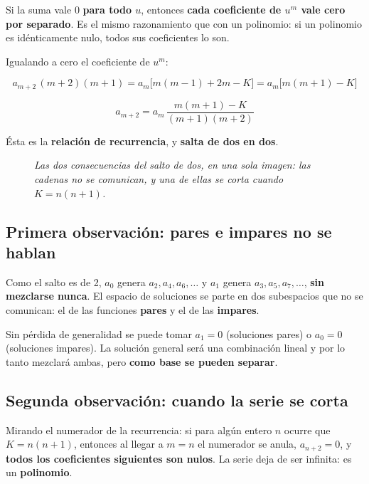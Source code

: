\documentclass[12pt,a4paper]{article}
\begin{document}
\begin{keybox}
Si la suma vale $0$ \textbf{para todo $u$}, entonces \textbf{cada coeficiente de
$u^m$ vale cero por separado}. Es el mismo razonamiento que con un polinomio: si
un polinomio es idénticamente nulo, todos sus coeficientes lo son.
\end{keybox}

Igualando a cero el coeficiente de $u^m$:

\[
a_{m+2}\,(m+2)(m+1) = a_m\big[m(m-1) + 2m - K\big] = a_m\big[m(m+1) - K\big]
\]

\[
\boxed{\;a_{m+2} = a_m\,\frac{m(m+1) - K}{(m+1)(m+2)}\;}
\]

Ésta es la \textbf{relación de recurrencia}, y \textbf{salta de dos en dos}.

\begin{figure}[H]
  \centering
  
  \caption*{\small\itshape Las dos consecuencias del salto de dos, en una sola
  imagen: las cadenas no se comunican, y una de ellas se corta cuando
  $K=n(n+1)$.}
\end{figure}

\subsection{Primera observación: pares e impares no se hablan}

Como el salto es de 2, $a_0$ genera $a_2, a_4, a_6,\dots$ y $a_1$ genera
$a_3, a_5, a_7,\dots$, \textbf{sin mezclarse nunca}. El espacio de soluciones se
parte en dos subespacios que no se comunican: el de las funciones \textbf{pares}
y el de las \textbf{impares}.

\begin{notebox}
Sin pérdida de generalidad se puede tomar $a_1=0$ (soluciones pares) o $a_0=0$
(soluciones impares). La solución general será una combinación lineal y por lo
tanto mezclará ambas, pero \textbf{como base se pueden separar}.
\end{notebox}

\subsection{Segunda observación: cuando la serie se corta}

Mirando el numerador de la recurrencia: si para algún entero $n$ ocurre que
$K = n(n+1)$, entonces al llegar a $m=n$ el numerador se anula, $a_{n+2}=0$, y
\textbf{todos los coeficientes siguientes son nulos}. La serie deja de ser
infinita: es un \textbf{polinomio}.
\end{document}
